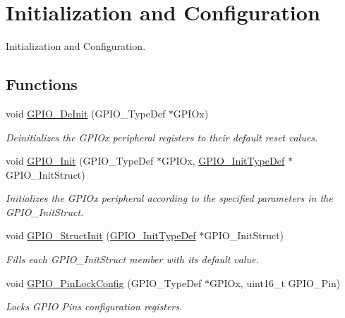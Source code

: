 \hypertarget{group___g_p_i_o___group1}{\section{Initialization and Configuration}
\label{group___g_p_i_o___group1}
}


Initialization and Configuration.  


\subsection*{Functions}
\begin{DoxyCompactItemize}
\item 
void \hyperlink{group___g_p_i_o___group1_gaa60bdf3182c44b5fa818f237042f52ee}{G\-P\-I\-O\-\_\-\-De\-Init} (G\-P\-I\-O\-\_\-\-Type\-Def $\ast$G\-P\-I\-Ox)
\begin{DoxyCompactList}\small\item\em Deinitializes the G\-P\-I\-Ox peripheral registers to their default reset values. \end{DoxyCompactList}\item 
void \hyperlink{group___g_p_i_o___group1_ga71abf9404261370d03cca449b88d3a65}{G\-P\-I\-O\-\_\-\-Init} (G\-P\-I\-O\-\_\-\-Type\-Def $\ast$G\-P\-I\-Ox, \hyperlink{struct_g_p_i_o___init_type_def}{G\-P\-I\-O\-\_\-\-Init\-Type\-Def} $\ast$G\-P\-I\-O\-\_\-\-Init\-Struct)
\begin{DoxyCompactList}\small\item\em Initializes the G\-P\-I\-Ox peripheral according to the specified parameters in the G\-P\-I\-O\-\_\-\-Init\-Struct. \end{DoxyCompactList}\item 
void \hyperlink{group___g_p_i_o___group1_gab28de41278e7f8c63d0851e2733b10df}{G\-P\-I\-O\-\_\-\-Struct\-Init} (\hyperlink{struct_g_p_i_o___init_type_def}{G\-P\-I\-O\-\_\-\-Init\-Type\-Def} $\ast$G\-P\-I\-O\-\_\-\-Init\-Struct)
\begin{DoxyCompactList}\small\item\em Fills each G\-P\-I\-O\-\_\-\-Init\-Struct member with its default value. \end{DoxyCompactList}\item 
void \hyperlink{group___g_p_i_o___group1_gad2f2e615928c69fd0d8c641a7cedaafc}{G\-P\-I\-O\-\_\-\-Pin\-Lock\-Config} (G\-P\-I\-O\-\_\-\-Type\-Def $\ast$G\-P\-I\-Ox, uint16\-\_\-t G\-P\-I\-O\-\_\-\-Pin)
\begin{DoxyCompactList}\small\item\em Locks G\-P\-I\-O Pins configuration registers. \end{DoxyCompactList}\end{DoxyCompactItemize}


